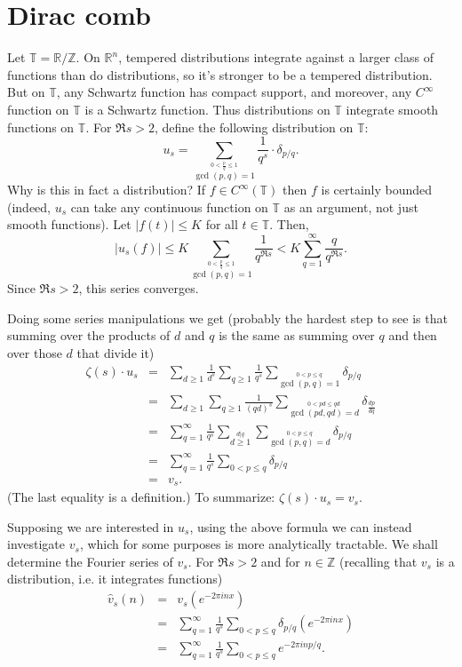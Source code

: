 \documentclass{article}
\begin{document}
\section{Dirac comb}
Let $\mathbb{T}=\mathbb{R} / \mathbb{Z}$. 
On $\mathbb{R}^n$, tempered distributions
integrate against a larger class of functions than do distributions, so it's stronger to be a tempered distribution. 
But on $\mathbb{T}$, any Schwartz function has compact support, and moreover, any
$C^\infty$ function on $\mathbb{T}$ is a Schwartz function. Thus distributions on $\mathbb{T}$ integrate smooth
functions on $\mathbb{T}$. 
For $\Re s > 2$, define the following distribution on $\mathbb{T}$: 
\[
u_s=\sum_{\stackrel{0 < \frac{p}{q} \leq 1}{\gcd(p,q)=1}} \frac{1}{q^s} \cdot \delta_{p/q}.
\]
Why is this in fact a distribution? If $f \in C^\infty(\mathbb{T})$ then $f$ is certainly bounded (indeed,
$u_s$ can take any continuous function on $\mathbb{T}$ as an argument, not just smooth functions). Let $|f(t)| \leq K$ for
all $t \in \mathbb{T}$. Then,
\[
|u_s(f)| \leq K \sum_{\stackrel{0 < \frac{p}{q} \leq 1}{\gcd(p,q)=1}} \frac{1}{q^{\Re s}}
<K\sum_{q=1}^\infty \frac{q}{q^{\Re s}}.
\]
Since $\Re s>2$, this series converges. 

Doing some series manipulations we get (probably the hardest step to see is that summing over the products of $d$ and $q$ is the same
as summing over $q$ and then over those $d$ that divide it)
\begin{eqnarray*}
\zeta(s)\cdot u_s&=&\sum_{d \geq 1} \frac{1}{d^s} \sum_{q \geq 1} \frac{1}{q^s} \sum_{\stackrel{0<p \leq q}{\gcd(p,q)=1}} \delta_{p/q}\\
&=&\sum_{d \geq 1} \sum_{q \geq 1} \frac{1}{(qd)^s}  \sum_{\stackrel{0<pd \leq qd}{\gcd(pd,qd)=d}} \delta_{\frac{dp}{dq}}\\
&=&\sum_{q=1}^\infty \frac{1}{q^s} \sum_{\stackrel{d|q}{d \geq 1}}  \sum_{\stackrel{0<p \leq q}{\gcd(p,q)=d}} \delta_{p/q}\\
&=&\sum_{q=1}^\infty \frac{1}{q^s} \sum_{0<p \leq q} \delta_{p/q}\\
&=&v_s.
\end{eqnarray*}
(The last equality is a definition.) To summarize: $\zeta(s)\cdot u_s=v_s$.

Supposing we are interested in $u_s$, using the above formula we can instead investigate $v_s$, which for some purposes is more analytically tractable.
We shall determine the Fourier series of $v_s$.
For $\Re s>2$ and for $n \in \mathbb{Z}$ (recalling that $v_s$ is a distribution, i.e. it integrates functions)
\begin{eqnarray*}
\widehat{v}_s(n)&=&v_s(e^{-2\pi i nx})\\
&=&\sum_{q=1}^\infty \frac{1}{q^s} \sum_{0 < p \leq q} \delta_{p/q}(e^{-2\pi inx})\\
&=&\sum_{q=1}^\infty \frac{1}{q^s} \sum_{0 < p \leq q} e^{-2\pi i np/q}.
\end{eqnarray*}
\end{document}
